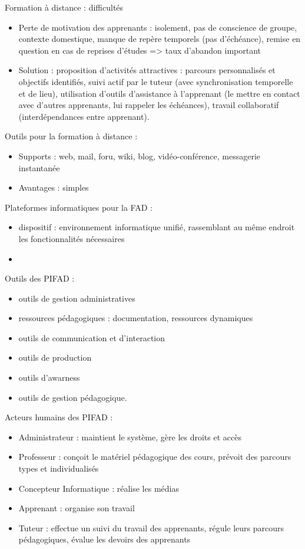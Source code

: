 \documentclass[11pt]{article}
\begin{document}
Formation à distance : difficultés
\begin{itemize}
	\item Perte de motivation des apprenants : isolement, pas de conscience de groupe, contexte domestique, manque de repère temporels (pas d'échéance), remise en question en cas de reprises d'études => taux d'abandon important
	\item Solution : proposition d'activités attractives : parcours personnalisés et objectifs identifiés, suivi actif par le tuteur (avec synchronisation temporelle et de lieu), utilisation d'outils d'assistance à l'apprenant (le mettre en contact avec d'autres apprenants, lui rappeler les échéances), travail collaboratif (interdépendances entre apprenant).
\end{itemize}

\vskip 1cm

Outils pour la formation à distance :
\begin{itemize}
	\item Supports : web, mail, foru, wiki, blog, vidéo-conférence, messagerie instantanée
	\item Avantages : simples
\end{itemize}

Plateformes informatiques pour la FAD :
\begin{itemize}
	\item  dispositif : environnement informatique unifié, rassemblant au même endroit les fonctionnalités nécessaires
	\item 
\end{itemize}

Outils des PIFAD :
\begin{itemize}
	\item outils de gestion administratives
	\item ressources pédagogiques : documentation, ressources dynamiques
	\item outils de communication et d'interaction
	\item outils de production
	\item outils d'awarness
	\item outils de gestion pédagogique.
\end{itemize}

Acteurs humains des PIFAD :
\begin{itemize}
	\item Administrateur : maintient le système, gère les droits et accès
	\item Professeur : conçoit le matériel pédagogique des cours, prévoit des parcours types et individualisés
	\item Concepteur Informatique : réalise les médias
	\item Apprenant : organise son travail
	\item Tuteur : effectue un suivi du travail des apprenants, régule leurs parcours pédagogiques, évalue les devoirs des apprenants
\end{itemize}
\end{document}
